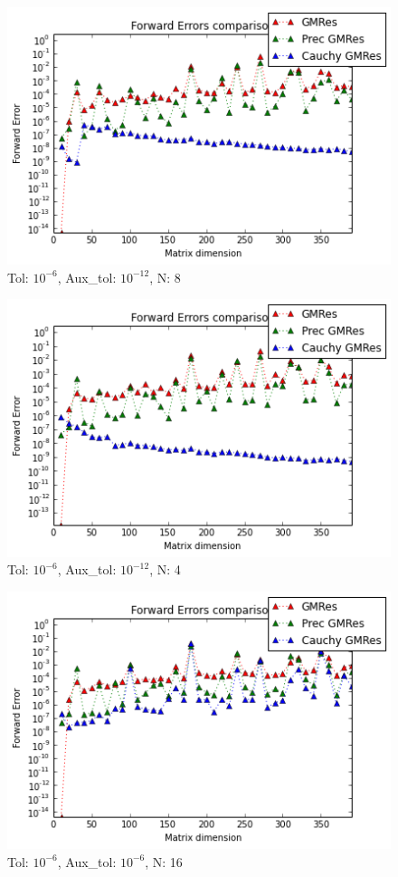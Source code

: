 \documentclass[fleqn]{article}
\begin{document}
\begin{figure}[ht]
    \centering
    \includegraphics[scale=0.4]{images/x4.png}
    \caption{Tol: $10^{-6}$, Aux\_tol: $10^{-12}$, N: 8}
    \label{fig:16}
\end{figure}
\newpage
\begin{figure}[ht]
    \centering
    \includegraphics[scale=0.4]{images/x5.png}
    \caption{Tol: $10^{-6}$, Aux\_tol: $10^{-12}$, N: 4}
    \label{fig:17}
\end{figure}

\begin{figure}[ht]
    \centering
    \includegraphics[scale=0.4]{images/x6.png}
    \caption{Tol: $10^{-6}$, Aux\_tol: $10^{-6}$, N: 16}
    \label{fig:18}
\end{figure}
\end{document}
